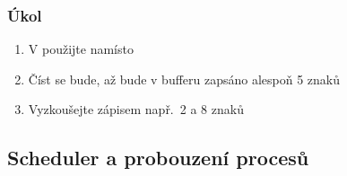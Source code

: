 \begin{frame}
  \frametitle{Úkol}

  \begin{enumerate}
    \item V  použijte namísto 
    \item Číst se bude, až bude v bufferu zapsáno alespoň 5 znaků
    \item Vyzkoušejte zápisem např.\ 2 a 8 znaků
  \end{enumerate}

\end{frame}

\iffimuni
\subsection{Scheduler a probouzení procesů}

